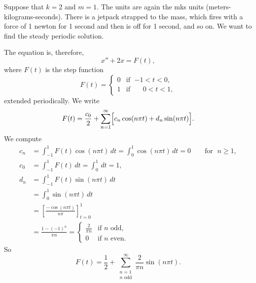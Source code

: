 \begin{example} \label{afs:steadyex}
Suppose that $k=2$ and $m=1$.
The units are again the mks units
(meters-kilograms-seconds).
There is a jetpack strapped to the mass, which fires with a force of 1
newton for 1
second and then is off for 1 second, and so on.  We want to find the steady periodic
solution.

The equation is, therefore,
\begin{equation*}
x'' + 2 x = F(t) ,
\end{equation*}
where $F(t)$ is the step function
\begin{equation*}
F(t) =
\begin{cases}
0 & \text{if } \; {-1} < t < 0 , \\
1 & \text{if } \; \phantom{-}0 < t < 1 ,
\end{cases}
\end{equation*}
extended periodically.
We write
\begin{equation*}
F(t) = \frac{c_0}{2} + \sum_{n=1}^\infty
\Bigl[
c_n \cos (n \pi t) +
d_n \sin (n \pi t)
\Bigr] .
\end{equation*}
We compute
\begin{align*}
c_n & = \int_{-1}^1 F(t) \cos (n \pi t) \, dt = 
\int_{0}^1 \cos (n \pi t) \, dt = 0 \qquad \text{for } \; n \geq 1,
\\
c_0 & = \int_{-1}^1 F(t) \, dt = 
\int_{0}^1 \, dt = 1 ,
\\
d_n & = \int_{-1}^1 F(t) \sin (n \pi t) \, dt
\\
& = \int_{0}^1 \sin (n \pi t) \, dt
\\
& = \left[ \frac{-\cos (n \pi t)}{n \pi} \right]_{t=0}^1
\\
& = \frac{1-{(-1)}^n}{\pi n} =
\begin{cases}
\frac{2}{\pi n} & \text{if } n \text{ odd} , \\
0 & \text{if } n \text{ even} .
\end{cases}
\end{align*}
So
\begin{equation*}
F(t) = \frac{1}{2} + \sum_{\substack{n=1 \\ n \text{ odd}}}^\infty
\frac{2}{\pi n} \sin (n \pi t) .
\end{equation*}


\end{example}
